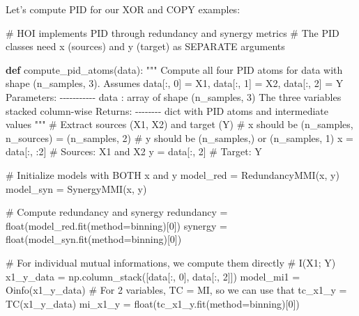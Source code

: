 \documentclass[
  11pt,
  letterpaper,
  oneside,
  openany]{book}
\newenvironment{Shaded}{\begin{snugshade}}{\end{snugshade}}
\newcommand{\BuiltInTok}[1]{\textcolor[rgb]{0.00,0.23,0.31}{#1}}
\newcommand{\CommentTok}[1]{\textcolor[rgb]{0.37,0.37,0.37}{#1}}
\newcommand{\DecValTok}[1]{\textcolor[rgb]{0.68,0.00,0.00}{#1}}
\newcommand{\KeywordTok}[1]{\textcolor[rgb]{0.00,0.23,0.31}{\textbf{#1}}}
\newcommand{\NormalTok}[1]{\textcolor[rgb]{0.00,0.23,0.31}{#1}}
\newcommand{\OperatorTok}[1]{\textcolor[rgb]{0.37,0.37,0.37}{#1}}
\newcommand{\StringTok}[1]{\textcolor[rgb]{0.13,0.47,0.30}{#1}}
\begin{document}
Let's compute PID for our XOR and COPY examples:

\begin{Shaded}
\begin{Highlighting}[]
\CommentTok{\# HOI implements PID through redundancy and synergy metrics}
\CommentTok{\# The PID classes need x (sources) and y (target) as SEPARATE arguments}

\KeywordTok{def}\NormalTok{ compute\_pid\_atoms(data):}
    \CommentTok{"""}
\CommentTok{    Compute all four PID atoms for data with shape (n\_samples, 3).}
\CommentTok{    Assumes data[:, 0] = X1, data[:, 1] = X2, data[:, 2] = Y}
\CommentTok{    }
\CommentTok{    Parameters:}
\CommentTok{    {-}{-}{-}{-}{-}{-}{-}{-}{-}{-}{-}}
\CommentTok{    data : array of shape (n\_samples, 3)}
\CommentTok{        The three variables stacked column{-}wise}
\CommentTok{    }
\CommentTok{    Returns:}
\CommentTok{    {-}{-}{-}{-}{-}{-}{-}{-}}
\CommentTok{    dict with PID atoms and intermediate values}
\CommentTok{    """}
    \CommentTok{\# Extract sources (X1, X2) and target (Y)}
    \CommentTok{\# x should be (n\_samples, n\_sources) = (n\_samples, 2)}
    \CommentTok{\# y should be (n\_samples,) or (n\_samples, 1)}
\NormalTok{    x }\OperatorTok{=}\NormalTok{ data[:, :}\DecValTok{2}\NormalTok{]  }\CommentTok{\# Sources: X1 and X2}
\NormalTok{    y }\OperatorTok{=}\NormalTok{ data[:, }\DecValTok{2}\NormalTok{]   }\CommentTok{\# Target: Y}
    
    \CommentTok{\# Initialize models with BOTH x and y}
\NormalTok{    model\_red }\OperatorTok{=}\NormalTok{ RedundancyMMI(x, y)}
\NormalTok{    model\_syn }\OperatorTok{=}\NormalTok{ SynergyMMI(x, y)}
    
    \CommentTok{\# Compute redundancy and synergy}
\NormalTok{    redundancy }\OperatorTok{=} \BuiltInTok{float}\NormalTok{(model\_red.fit(method}\OperatorTok{=}\StringTok{\textquotesingle{}binning\textquotesingle{}}\NormalTok{)[}\DecValTok{0}\NormalTok{])}
\NormalTok{    synergy }\OperatorTok{=} \BuiltInTok{float}\NormalTok{(model\_syn.fit(method}\OperatorTok{=}\StringTok{\textquotesingle{}binning\textquotesingle{}}\NormalTok{)[}\DecValTok{0}\NormalTok{])}
    
    \CommentTok{\# For individual mutual informations, we compute them directly}
    \CommentTok{\# I(X1; Y) }
\NormalTok{    x1\_y\_data }\OperatorTok{=}\NormalTok{ np.column\_stack([data[:, }\DecValTok{0}\NormalTok{], data[:, }\DecValTok{2}\NormalTok{]])}
\NormalTok{    model\_mi1 }\OperatorTok{=}\NormalTok{ Oinfo(x1\_y\_data)}
    \CommentTok{\# For 2 variables, TC = MI, so we can use that}
\NormalTok{    tc\_x1\_y }\OperatorTok{=}\NormalTok{ TC(x1\_y\_data)}
\NormalTok{    mi\_x1\_y }\OperatorTok{=} \BuiltInTok{float}\NormalTok{(tc\_x1\_y.fit(method}\OperatorTok{=}\StringTok{\textquotesingle{}binning\textquotesingle{}}\NormalTok{)[}\DecValTok{0}\NormalTok{])}
    

\end{Highlighting}
\end{Shaded}
\end{document}
